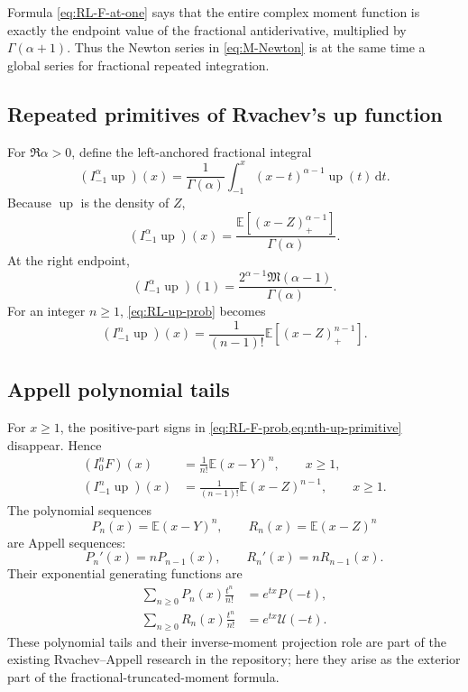 \documentclass[11pt,oneside]{article}
\theoremstyle{definition}
\newcommand{\F}{F}
\newcommand{\upf}{\operatorname{up}}
\newcommand{\M}{\mathfrak M}
\newcommand{\E}{\mathbb E}
\newcommand{\dd}{\,\mathrm d}
\begin{document}
Formula \cref{eq:RL-F-at-one} says that the entire complex moment function is exactly
the endpoint value of the fractional antiderivative, multiplied by
\(\Gamma(\alpha+1)\).  Thus the Newton series in \cref{eq:M-Newton} is at the same
time a global series for fractional repeated integration.

\subsection{Repeated primitives of Rvachev's up function}

For \(\Re\alpha>0\), define the left-anchored fractional integral
\begin{equation}\label{eq:RL-up-def}
 (I_{-1}^\alpha\upf)(x)
 =\frac1{\Gamma(\alpha)}\int_{-1}^x(x-t)^{\alpha-1}\upf(t)\dd t.
\end{equation}
Because \(\upf\) is the density of \(Z\),
\begin{equation}\label{eq:RL-up-prob}
 (I_{-1}^\alpha\upf)(x)
 =\frac{\E[(x-Z)_+^{\alpha-1}]}{\Gamma(\alpha)}.
\end{equation}
At the right endpoint,
\begin{equation}\label{eq:RL-up-at-one}
 (I_{-1}^\alpha\upf)(1)
 =\frac{2^{\alpha-1}\M(\alpha-1)}{\Gamma(\alpha)}.
\end{equation}
For an integer \(n\ge1\), \cref{eq:RL-up-prob} becomes
\begin{equation}\label{eq:nth-up-primitive}
 (I_{-1}^n\upf)(x)
 =\frac1{(n-1)!}\E[(x-Z)_+^{n-1}].
\end{equation}

\subsection{Appell polynomial tails}

For \(x\ge1\), the positive-part signs in \cref{eq:RL-F-prob,eq:nth-up-primitive}
disappear.  Hence
\begin{align}
 (I_0^n\F)(x)&=\frac1{n!}\E(x-Y)^n,\qquad x\ge1,
 \label{eq:F-Appell-tail}\\
 (I_{-1}^n\upf)(x)&=\frac1{(n-1)!}\E(x-Z)^{n-1},\qquad x\ge1.
 \label{eq:up-Appell-tail}
\end{align}
The polynomial sequences
\begin{equation}\label{eq:Appell-polynomials}
 P_n(x)=\E(x-Y)^n,
 \qquad R_n(x)=\E(x-Z)^n
\end{equation}
are Appell sequences:
\begin{equation}\label{eq:Appell-derivative}
 P_n'(x)=nP_{n-1}(x),\qquad R_n'(x)=nR_{n-1}(x).
\end{equation}
Their exponential generating functions are
\begin{align}
 \sum_{n\ge0}P_n(x)\frac{t^n}{n!}
 &=e^{tx}P(-t),\label{eq:Pn-egf}\\
 \sum_{n\ge0}R_n(x)\frac{t^n}{n!}
 &=e^{tx}\mathcal U(-t).\label{eq:Rn-egf}
\end{align}
These polynomial tails and their inverse-moment projection role are part of the existing
Rvachev--Appell research in the repository; here they arise as the exterior part of the
fractional-truncated-moment formula.
\end{document}
